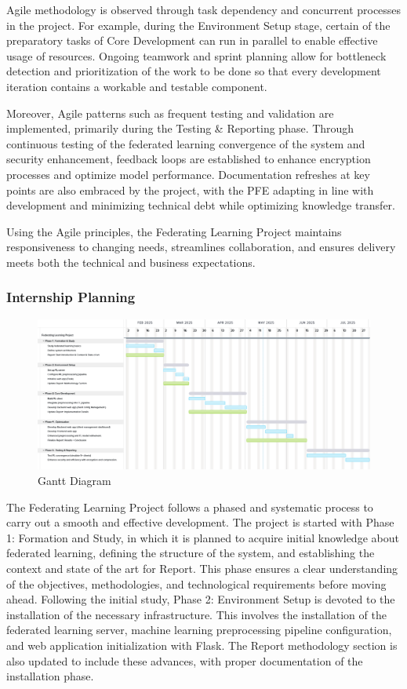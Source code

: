 Agile methodology is observed through task dependency and concurrent processes in the project. For example, during the Environment Setup stage, certain of the preparatory tasks of Core Development can run in parallel to enable effective usage of resources. Ongoing teamwork and sprint planning allow for bottleneck detection and prioritization of the work to be done so that every development iteration contains a workable and testable component.

Moreover, Agile patterns such as frequent testing and validation are implemented, primarily during the Testing \& Reporting phase. Through continuous testing of the federated learning convergence of the system and security enhancement, feedback loops are established to enhance encryption processes and optimize model performance. Documentation refreshes at key points are also embraced by the project, with the PFE adapting in line with development and minimizing technical debt while optimizing knowledge transfer.

Using the Agile principles, the Federating Learning Project maintains responsiveness to changing needs, streamlines collaboration, and ensures delivery meets both the technical and business expectations.

\subsubsection{Internship Planning}
\begin{figure}[H]
    \centering
    \includegraphics[width=1\linewidth]{Figures/Gantt.png}
    \caption{Gantt Diagram}
    \label{fig:enter-label}
\end{figure}
The Federating Learning Project follows a phased and systematic process to carry out a smooth and effective development. The project is started with Phase 1: Formation and Study, in which it is planned to acquire initial knowledge about federated learning, defining the structure of the system, and establishing the context and state of the art for Report. This phase ensures a clear understanding of the objectives, methodologies, and technological requirements before moving ahead. Following the initial study, Phase 2: Environment Setup is devoted to the installation of the necessary infrastructure. This involves the installation of the federated learning server, machine learning preprocessing pipeline configuration, and web application initialization with Flask. The Report methodology section is also updated to include these advances, with proper documentation of the installation phase.

